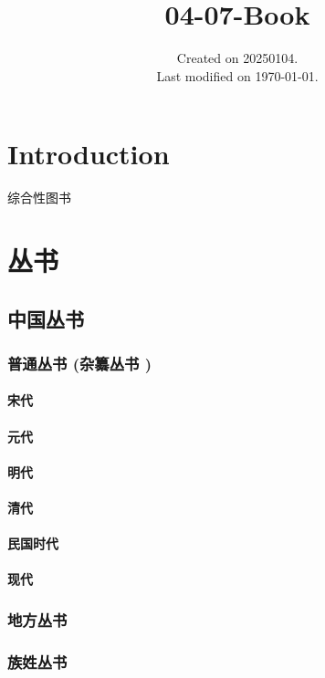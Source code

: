 \documentclass[UTF8]{../ApplicationUniverse}
\begin{document}
\title{04-07-Book}
\date{Created on 20250104.\\   Last modified on \today.}
\maketitle
\tableofcontents


\chapter{Introduction}


综合性图书



\chapter{丛书}
\section{中国丛书}
    \subsection{普通丛书 (杂纂丛书 )}
        \subsubsection{宋代}
        \subsubsection{元代}
        \subsubsection{明代}
        \subsubsection{清代}
        \subsubsection{民国时代}
        \subsubsection{现代}
    \subsection{地方丛书}
    \subsection{族姓丛书}
\end{document}
